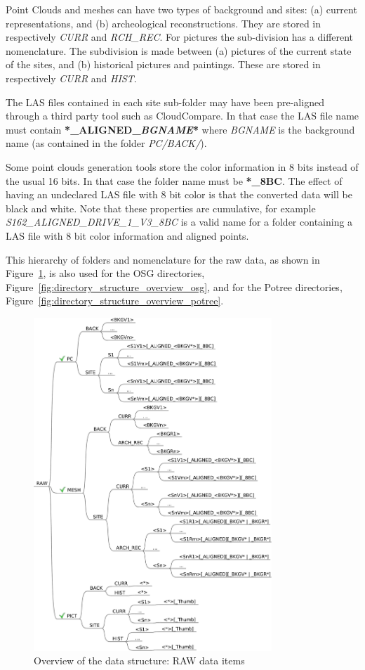 Point Clouds and meshes can have two types of background and sites: (a) current
representations, and (b) archeological reconstructions. They are stored in respectively
\textit{CURR} and \textit{RCH\_REC}. For pictures the sub-division has a different
nomenclature. The subdivision is made between (a) pictures of the current state of
the sites, and (b) historical pictures and paintings. These are stored in respectively
\textit{CURR} and \textit{HIST}.

The LAS files contained in each site sub-folder may have been pre-aligned through a
third party tool such as CloudCompare. In that case the LAS file name must contain
\textbf{*\_ALIGNED\_\textit{BGNAME}*} where \textit{BGNAME} is the background name
(as contained in the folder \textit{PC/BACK/}).

Some point clouds generation tools store the color information in 8 bits instead of
the usual 16 bits. In that case the folder name must be \textbf{*\_8BC}. The effect
of having an undeclared LAS file with 8 bit color is that the converted data will be
black and white. Note that these properties are cumulative, for example
\textit{S162\_ALIGNED\_DRIVE\_1\_V3\_8BC} is a valid name for a folder containing
a LAS file with 8 bit color information and aligned points.

This hierarchy of folders and nomenclature for the raw data, as shown in Figure~\ref{fig:directory_structure_overview_raw},
is also used for the OSG directories, Figure~\ref{fig:directory_structure_overview_osg},
and for the Potree directories, Figure~\ref{fig:directory_structure_overview_potree}.

\begin{figure}[] \centering
\includegraphics[width=0.8\textwidth]{fig/data_structure/directory_structure_raw}
\caption{Overview of the data structure: RAW data items}
\label{fig:directory_structure_overview_raw} \end{figure}


